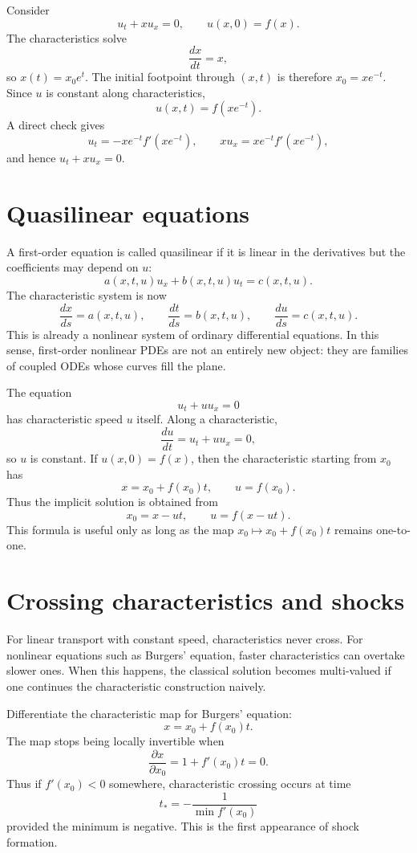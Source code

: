 \begin{example}
Consider
\[
  u_t+xu_x=0,\qquad u(x,0)=f(x).
\]
The characteristics solve
\[
  \frac{dx}{dt}=x,
\]
so \(x(t)=x_0e^t\).  The initial footpoint through \((x,t)\) is therefore \(x_0=xe^{-t}\).  Since \(u\) is constant along characteristics,
\[
  u(x,t)=f(xe^{-t}).
\]
A direct check gives
\[
  u_t=-xe^{-t}f'(xe^{-t}),\qquad xu_x=xe^{-t}f'(xe^{-t}),
\]
and hence \(u_t+xu_x=0\).
\end{example}

\section{Quasilinear equations}

A first-order equation is called quasilinear if it is linear in the derivatives but the coefficients may depend on \(u\):
\[
  a(x,t,u)u_x+b(x,t,u)u_t=c(x,t,u).
\]
The characteristic system is now
\[
  \frac{dx}{ds}=a(x,t,u),\qquad
  \frac{dt}{ds}=b(x,t,u),\qquad
  \frac{du}{ds}=c(x,t,u).
\]
This is already a nonlinear system of ordinary differential equations.  In this sense, first-order nonlinear PDEs are not an entirely new object: they are families of coupled ODEs whose curves fill the plane.

\begin{example}
The equation
\[
  u_t+u u_x=0
\]
has characteristic speed \(u\) itself.  Along a characteristic,
\[
  \frac{du}{dt}=u_t+u u_x=0,
\]
so \(u\) is constant.  If \(u(x,0)=f(x)\), then the characteristic starting from \(x_0\) has
\[
  x=x_0+f(x_0)t,\qquad u=f(x_0).
\]
Thus the implicit solution is obtained from
\[
  x_0=x-u t,\qquad u=f(x-u t).
\]
This formula is useful only as long as the map \(x_0\mapsto x_0+f(x_0)t\) remains one-to-one.
\end{example}

\section{Crossing characteristics and shocks}

For linear transport with constant speed, characteristics never cross.  For nonlinear equations such as Burgers' equation, faster characteristics can overtake slower ones.  When this happens, the classical solution becomes multi-valued if one continues the characteristic construction naively.

Differentiate the characteristic map for Burgers' equation:
\[
  x=x_0+f(x_0)t.
\]
The map stops being locally invertible when
\[
  \frac{\partial x}{\partial x_0}=1+f'(x_0)t=0.
\]
Thus if \(f'(x_0)<0\) somewhere, characteristic crossing occurs at time
\[
  t_*=-\frac{1}{\min f'(x_0)}
\]
provided the minimum is negative.  This is the first appearance of shock formation.

